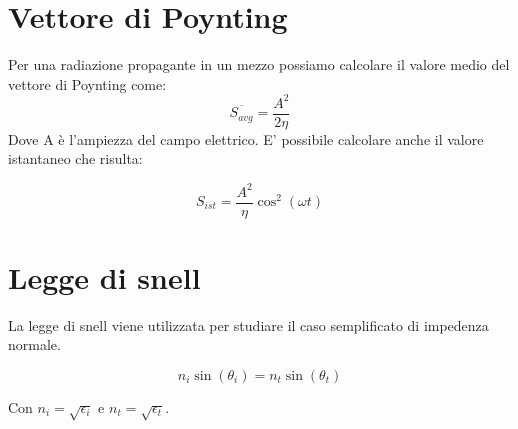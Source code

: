 	\section{Vettore di Poynting}
		Per una radiazione propagante in un mezzo possiamo calcolare il valore medio del vettore di Poynting come:
		\begin{equation}
		\overline{S_{avg}}=\frac{A^2}{2\eta}
		\end{equation}
		Dove A è l'ampiezza del campo elettrico.
		E' possibile calcolare anche il valore istantaneo che risulta:

		\begin{equation}
		S_{ist}=\frac{A^2}{\eta}\cos^2(\omega t)
		\end{equation}
	
	\section{Legge di snell}

	La legge di snell viene utilizzata per studiare il caso semplificato di impedenza normale.

	\begin{equation}
	n_i \sin(\theta_i) = n_t \sin(\theta_t)
	\end{equation}

	Con $n_i=\sqrt{\epsilon_i}$ e $n_t=\sqrt{\epsilon_t}$.
